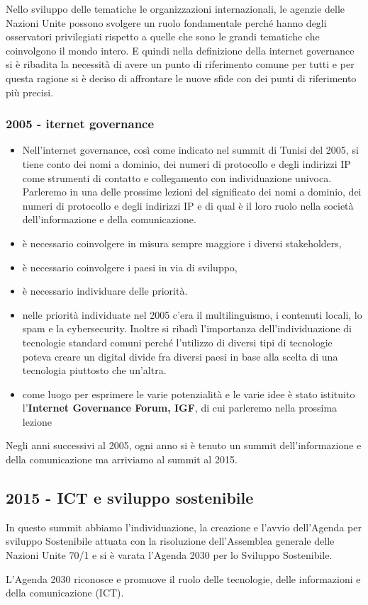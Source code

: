 Nello sviluppo delle tematiche le organizzazioni internazionali, le agenzie delle Nazioni Unite possono svolgere un ruolo fondamentale perché hanno degli osservatori privilegiati rispetto a quelle che sono le grandi tematiche che coinvolgono il mondo intero. E quindi nella definizione della internet governance si è ribadita la necessità di avere un punto di riferimento comune per tutti e per questa ragione si è deciso di affrontare le nuove sfide con dei punti di riferimento più precisi.

\subsubsection{2005 - iternet governance}

\begin{itemize}
    \item Nell'internet governance, così come indicato nel summit di Tunisi del 2005, si tiene conto dei nomi a dominio, dei numeri di protocollo e degli indirizzi IP come strumenti di contatto e collegamento con individuazione univoca. Parleremo in una delle prossime lezioni del significato dei nomi a dominio, dei numeri di protocollo e degli indirizzi IP e di qual è il loro ruolo nella società dell'informazione e della comunicazione.

    \item è necessario coinvolgere in misura sempre maggiore i diversi stakeholders,
    \item è necessario coinvolgere i paesi in via di sviluppo,
    \item è necessario individuare delle priorità.
    \item nelle priorità individuate nel 2005 c'era il multilinguismo, i contenuti locali, lo spam e la cybersecurity. Inoltre si ribadì l'importanza dell'individuazione di tecnologie standard comuni perché l'utilizzo di diversi tipi di tecnologie poteva creare un digital divide fra diversi paesi in base alla scelta di una tecnologia piuttosto che un'altra.
    \item come luogo per esprimere le varie potenzialità e le varie idee è stato istituito l'\textbf{Internet Governance Forum, IGF}, di cui parleremo nella prossima lezione
\end{itemize}


Negli anni successivi al 2005, ogni anno si è tenuto un summit dell'informazione e della comunicazione ma arriviamo al summit al 2015.

\subsection{2015 - ICT e sviluppo sostenibile}
In questo summit abbiamo l'individuazione, la creazione e l'avvio dell'Agenda per sviluppo Sostenibile attuata con la risoluzione dell'Assemblea generale delle Nazioni Unite 70/1 e si è varata l'Agenda 2030 per lo Sviluppo Sostenibile. \par
L'Agenda 2030 riconosce e promuove il ruolo delle tecnologie, delle informazioni e della comunicazione (ICT). \par

